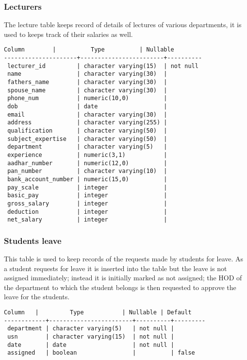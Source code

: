 \newpage
\subsubsection{Lecturers}

The lecture table keeps record of details of lectures of various departments,
it is used to keeps track of their salaries as well.

\begin{lstlisting}[basicstyle=\small]
       Column        |          Type          | Nullable
---------------------+------------------------+----------
 lecturer_id         | character varying(15)  | not null
 name                | character varying(30)  |
 fathers_name        | character varying(30)  |
 spouse_name         | character varying(30)  |
 phone_num           | numeric(10,0)          |
 dob                 | date                   |
 email               | character varying(30)  |
 address             | character varying(255) |
 qualification       | character varying(50)  |
 subject_expertise   | character varying(50)  |
 department          | character varying(5)   |
 experience          | numeric(3,1)           |
 aadhar_number       | numeric(12,0)          |
 pan_number          | character varying(10)  |
 bank_account_number | numeric(15,0)          |
 pay_scale           | integer                |
 basic_pay           | integer                |
 gross_salary        | integer                |
 deduction           | integer                |
 net_salary          | integer                |
\end{lstlisting}

\subsubsection{Students leave}

This table is used to keep records of the requests made by students for leave.
As a student requests for leave it is inserted into the table but the leave is
not assigned immediately; instead it is initially marked as not assigned; the
HOD of the department to which the student belongs is then requested to approve
the leave for the students.

\begin{lstlisting}[basicstyle=\small]
   Column   |         Type           | Nullable | Default
------------+------------------------+----------+---------
 department | character varying(5)   | not null |
 usn        | character varying(15)  | not null |
 date       | date                   | not null |
 assigned   | boolean                |          | false
\end{lstlisting}

